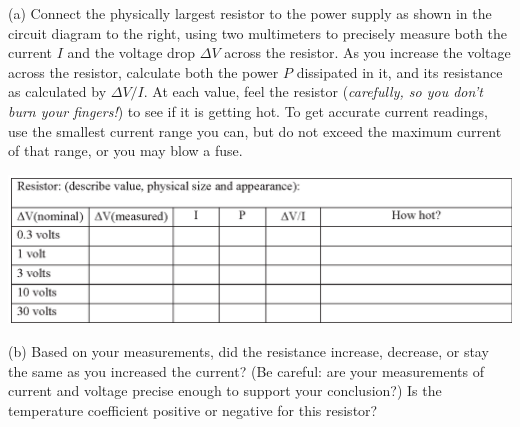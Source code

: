 (a) Connect the physically largest resistor to the power supply as shown in the circuit diagram to the right, using two multimeters to precisely measure both the current $I$ and the voltage drop $\Delta V$ across the resistor.  As you increase the voltage across the resistor, calculate both the power $P$ dissipated in it, and its resistance as calculated by $\Delta V/I$.  At each value, feel the resistor (\textit{carefully, so you don't burn your fingers!}) to see if it is getting hot.  To get accurate current readings, use the smallest current range you can, but do not exceed the maximum current of that range, or you may blow a fuse.

\begin{center}
\includegraphics[width=1.0\textwidth]{electric_power/iv_table.eps}
\end{center}

(b)  Based on your measurements, did the resistance increase, decrease, or stay the same as you increased the current?  (Be careful: are your measurements of current and voltage precise enough to support your conclusion?)  Is the temperature coefficient positive or negative for this resistor? 
\vspace{1.5in}

\begin{center}
 \par
\end{center}

